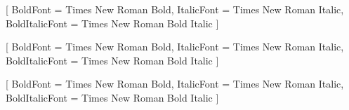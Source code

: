 \usepackage{graphicx} %
\usepackage{pifont} %
\usepackage{booktabs} %
\usepackage{multirow} %
\usepackage{threeparttable} %
\usepackage[noend]{algpseudocode} %
\usepackage{algorithmicx,algorithm}
\usepackage{pythonhighlight} %
\usepackage[colorlinks=true,linkcolor=black,anchorcolor=black,citecolor=green]{hyperref}%
\usepackage{caption}
\captionsetup[figure]{font=small,labelsep=space}
\captionsetup[table]{font=small,labelsep=space} %
\usepackage{enumitem} %


\usepackage[final]{pdfpages}
\usepackage{geometry}
\usepackage{makecell}
\usepackage{caption}
\usepackage{multirow}
\usepackage{booktabs}
\makeatletter
\let\c@lofdepth\relax
\let\c@lotdepth\relax
\makeatother
\usepackage{subfigure}
\usepackage{float}
\usepackage[titles,subfigure]{tocloft}
\usepackage{soul}
\usepackage{color,xcolor}

\usepackage{lscape}



\geometry{a4paper,top=3cm,bottom=2.5cm,left=2.5cm,right=2.5cm}

\linespread{1.5}\selectfont
\setlength{\parskip}{0pt}
\setlength{\headheight}{15pt} %

\setmainfont{Times New Roman}[
	BoldFont = Times New Roman Bold,
	ItalicFont = Times New Roman Italic,
	BoldItalicFont = Times New Roman Bold Italic
]

\setsansfont{Times New Roman}[
	BoldFont = Times New Roman Bold,
	ItalicFont = Times New Roman Italic,
	BoldItalicFont = Times New Roman Bold Italic
]

\setmonofont{Times New Roman}[
	BoldFont = Times New Roman Bold,
	ItalicFont = Times New Roman Italic,
	BoldItalicFont = Times New Roman Bold Italic
]

\usepackage{xeCJK}

\usepackage{type1cm}
\newcommand{\yihao}{\fontsize{26pt}{39pt}\selectfont}
\newcommand{\xiaoyi}{\fontsize{24pt}{36pt}\selectfont}
\newcommand{\erhao}{\fontsize{22pt}{33pt}\selectfont}
\newcommand{\xiaoer}{\fontsize{18pt}{27pt}\selectfont}
\newcommand{\sanhao}{\fontsize{16pt}{24pt}\selectfont}
\newcommand{\xiaosan}{\fontsize{15pt}{22.5pt}\selectfont}
\newcommand{\sihao}{\fontsize{14pt}{21pt}\selectfont}
\newcommand{\xiaosi}{\fontsize{12pt}{18pt}\selectfont}
\newcommand{\wuhao}{\fontsize{10.5pt}{15.75pt}\selectfont}
\newcommand{\xiaowu}{\fontsize{9pt}{13.5pt}\selectfont}
\newcommand{\liuhao}{\fontsize{7.5pt}{11.25pt}\selectfont}

